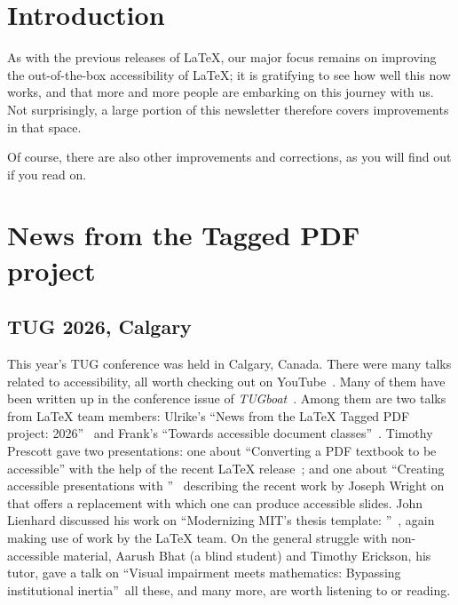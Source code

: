 \documentclass{ltnews}
\providecommand\Dash {\unskip \textemdash}
\let\cls\pkg
\begin{document}
\maketitle
{  \spaceskip=3.33pt 
\tableofcontents}


\setlength{}

\setlength\hfuzz{1pt}  %
\setlength\vfuzz{1pt}  %



\newpage


\section{Introduction}

As with the previous releases of \LaTeX{}, our major focus remains on
improving the out-of-the-box accessibility of \LaTeX{}; it is
gratifying to see how well this now works, and that more and more
people are embarking on this journey with us. Not surprisingly, a large
portion of this newsletter therefore covers improvements in that space.

Of course, there are also other improvements and corrections, as you
will find out if you read on.


\section{News from the Tagged PDF project}

\subsection{TUG 2026, Calgary}

This year's TUG conference was held in Calgary, Canada. There were
many talks related to accessibility, all worth checking out on
YouTube~\cite{44:videos}. Many of them have been written up in the
conference issue of \textsl{TUGboat}~\cite{44:isssue47}.  Among them are two
talks from \LaTeX{} team members: Ulrike's \enquote{News from the
  \LaTeX{} Tagged PDF project: 2026}~\cite{44:ufi} and Frank's
\enquote{Towards accessible document classes}~\cite{44:fmi}.  Timothy
Prescott gave two presentations: one about \enquote{Converting a PDF
  textbook to be accessible} with the help of the recent \LaTeX{}
release~\cite{44:tpr}; and one about \enquote{Creating accessible
  presentations with \cls{ltx-talk}}~\cite[p.\,208]{44:isssue47}
describing the recent work by Joseph Wright on \cls{ltx-talk} that
offers a \cls{beamer} replacement with which one can produce
accessible slides.  John Lienhard discussed his work on
\enquote{Modernizing MIT's thesis template:
  \cls{mitthesis.cls}}~\cite[p.\,212]{44:isssue47}, again making use
of work by the \LaTeX{} team.  On the general struggle with
non-accessible material, Aarush Bhat (a blind student) and Timothy
Erickson, his tutor, gave a talk on \enquote{Visual impairment meets
  mathematics: Bypassing institutional
  inertia}~\cite[p.\,195]{44:isssue47}\Dash all these, and many more,
are worth listening to or reading.
\end{document}

